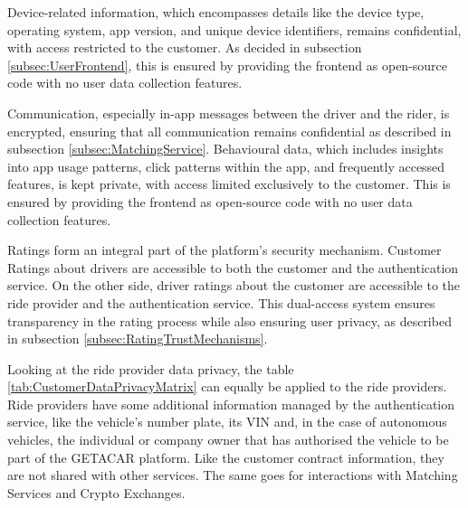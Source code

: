 Device-related information, which encompasses details like the device type, operating system, app version, and unique device identifiers, remains confidential, with access restricted to the customer. As decided in subsection \ref{subsec:UserFrontend}, this is ensured by providing the frontend as open-source code with no user data collection features.

Communication, especially in-app messages between the driver and the rider, is encrypted, ensuring that all communication remains confidential as described in subsection \ref{subsec:MatchingService}. Behavioural data, which includes insights into app usage patterns, click patterns within the app, and frequently accessed features, is kept private, with access limited exclusively to the customer. This is ensured by providing the frontend as open-source code with no user data collection features.

Ratings form an integral part of the platform's security mechanism. Customer Ratings about drivers are accessible to both the customer and the authentication service. On the other side, driver ratings about the customer are accessible to the ride provider and the authentication service. This dual-access system ensures transparency in the rating process while also ensuring user privacy, as described in subsection \ref{subsec:RatingTrustMechanisms}.

Looking at the ride provider data privacy, the table \ref{tab:CustomerDataPrivacyMatrix} can equally be applied to the ride providers. Ride providers have some additional information managed by the authentication service, like the vehicle's number plate, its VIN and, in the case of autonomous vehicles, the individual or company owner that has authorised the vehicle to be part of the GETACAR platform. Like the customer contract information, they are not shared with other services. The same goes for interactions with Matching Services and Crypto Exchanges.

